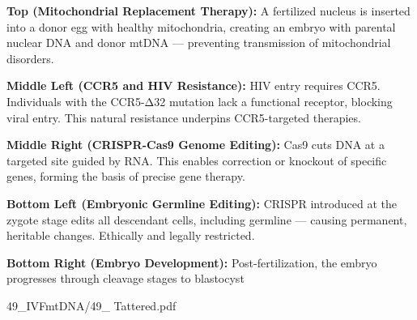 \begin{SideNotePage}{
  \textbf{Top (Mitochondrial Replacement Therapy):}  
  A fertilized nucleus is inserted into a donor egg with healthy mitochondria, creating an embryo with parental nuclear DNA and donor mtDNA — preventing transmission of mitochondrial disorders. \par

  \textbf{Middle Left (CCR5 and HIV Resistance):}  
  HIV entry requires CCR5. Individuals with the CCR5-Δ32 mutation lack a functional receptor, blocking viral entry. This natural resistance underpins CCR5-targeted therapies. \par

  \textbf{Middle Right (CRISPR-Cas9 Genome Editing):}  
  Cas9 cuts DNA at a targeted site guided by RNA. This enables correction or knockout of specific genes, forming the basis of precise gene therapy. \par

  \textbf{Bottom Left (Embryonic Germline Editing):}  
  CRISPR introduced at the zygote stage edits all descendant cells, including germline — causing permanent, heritable changes. Ethically and legally restricted. \par

  \textbf{Bottom Right (Embryo Development):}  
  Post-fertilization, the embryo progresses through cleavage stages to blastocyst
}{49_IVFmtDNA/49_ Tattered.pdf}
\end{SideNotePage}
